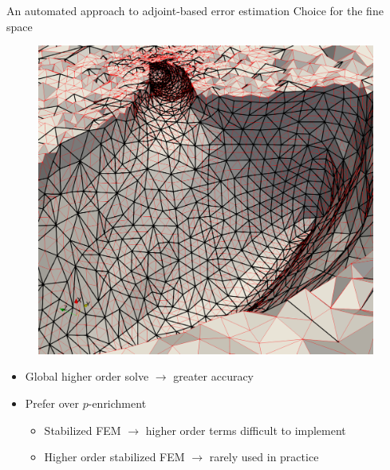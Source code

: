 \documentclass[fleqn]{beamer}
\begin{document}
\begin{frame}{An automated approach to adjoint-based error estimation}
{Choice for the fine space}
%
\begin{minipage}{0.5\textwidth}
\begin{figure}
\includegraphics[width=0.99\textwidth]{../img/aut_glial_nested}
\end{figure}
\end{minipage}%
\begin{minipage}{0.5\textwidth}
\begin{itemize}
\item Global higher order solve $\rightarrow$ greater accuracy
\item Prefer over $p$-enrichment
\begin{itemize}
\item Stabilized FEM $\rightarrow$ higher order terms difficult to implement 
\item Higher order stabilized FEM $\rightarrow$ rarely used in practice
\end{itemize}
\end{itemize}
\end{minipage}
\end{frame}

\end{document}

